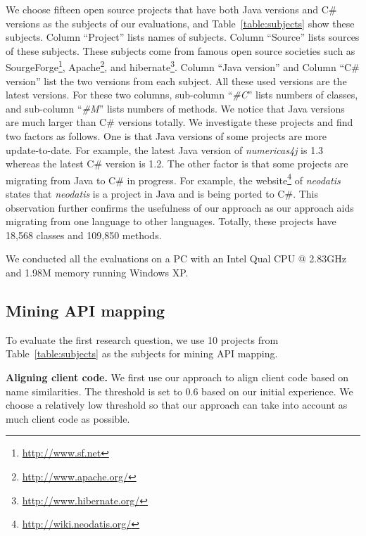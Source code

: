 We choose fifteen open source projects that have both Java versions
and C\# versions as the subjects of our evaluations, and
Table~\ref{table:subjects} show these subjects. Column ``Project''
lists names of subjects. Column ``Source'' lists sources of these
subjects. These subjects come from famous open source societies such
as SourgeForge\footnote{\url{http://www.sf.net}},
Apache\footnote{\url{http://www.apache.org/}}, and
hibernate\footnote{\url{http://www.hibernate.org/}}. Column ``Java
version'' and Column ``C\# version'' list the two versions from each
subject. All these used versions are the latest versions. For these
two columns, sub-column ``\emph{\#C}'' lists numbers of classes, and
sub-column ``\emph{\#M}'' lists numbers of methods. We notice that
Java versions are much larger than C\# versions totally. We
investigate these projects and find two factors as follows. One is
that Java versions of some projects are more update-to-date. For
example, the latest Java version of \emph{numericas4j} is 1.3
whereas the latest C\# version is 1.2. The other factor is that some
projects are migrating from Java to C\# in progress. For example,
the website\footnote{\url{http://wiki.neodatis.org/}} of
\emph{neodatis} states that \emph{neodatis} is a project in Java and
is being ported to C\#. This observation further confirms the
usefulness of our approach as our approach aids migrating from one
language to other languages. Totally, these projects have 18,568
classes and 109,850 methods.

We conducted all the evaluations on a PC with an Intel Qual CPU @
2.83GHz and 1.98M memory running Windows XP.
\subsection{Mining API mapping}
\label{sec:evaluation:mining}

To evaluate the first research question, we use 10 projects from
Table~\ref{table:subjects} as the subjects for mining API mapping.


\textbf{Aligning client code.} We first use our approach to align
client code based on name similarities. The threshold is set to 0.6
based on our initial experience. We choose a relatively low
threshold so that our approach can take into account as much client
code as possible.

